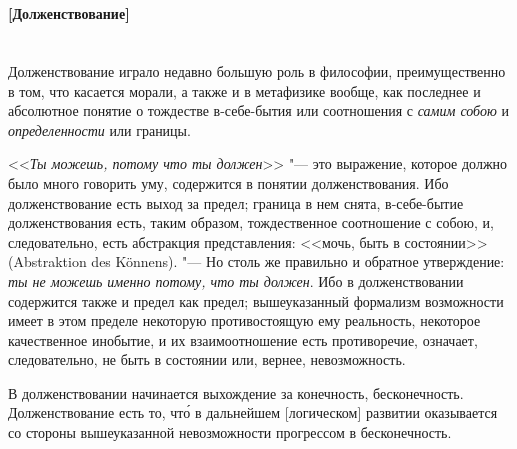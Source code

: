 \paragraph[Примечание. Долженствование]%
{\nopagebreak\\\vspace{1mm}
\footnotesize [Долженствование]\\\vspace{2mm}\\}

Долженствование играло недавно большую роль в философии, преимущественно в
том, что касается морали, а также и в метафизике вообще, как последнее и
абсолютное понятие о тождестве в-себе-бытия или соотношения с
{\em самим собою} и {\em определенности} или границы.

<<{\em Ты можешь, потому что ты должен}>> "--- это выражение,
которое должно было много говорить уму, содержится в понятии долженствования.
Ибо долженствование есть выход за предел; граница в нем снята, в-себе-бытие
долженствования есть, таким образом, тождественное соотношение с собою, и,
следовательно, есть абстракция представления: <<мочь, быть в состоянии>>
(Abstraktion des Könnens). "--- Но столь же правильно и обратное утверждение:
{\em ты не можешь именно потому, что ты должен}. Ибо в
долженствовании содержится также и предел как предел; вышеуказанный
формализм возможности имеет в этом пределе некоторую противостоящую ему
реальность, некоторое качественное инобытие, и их взаимоотношение есть
противоречие, означает, следовательно, не быть в состоянии или, вернее,
невозможность.

В долженствовании начинается выхождение за конечность, бесконечность.
Долженствование есть то, чт\'{о} в дальнейшем [логическом] развитии оказывается
со стороны вышеуказанной невозможности прогрессом в бесконечность.

